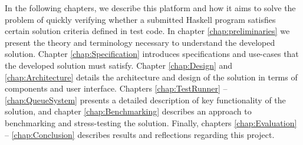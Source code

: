 In the following chapters, we describe this platform and how it aims to solve the problem of quickly verifying whether a submitted Haskell program satisfies certain solution criteria defined in test code. 
In chapter \ref{chap:preliminaries} we present the theory and terminology necessary to understand the developed solution. 
Chapter \ref{chap:Specification} introduces specifications and use-cases that the developed solution must satisfy. 
Chapter \ref{chap:Design} and \ref{chap:Architecture} details the architecture and design of the solution in terms of components and user interface.
Chapters \ref{chap:TestRunner} -- \ref{chap:QueueSystem} presents a detailed description of key functionality of the solution, and chapter \ref{chap:Benchmarking} describes an approach to benchmarking and stress-testing the solution. 
Finally, chapters \ref{chap:Evaluation} -- \ref{chap:Conclusion} describes results and reflections regarding this project.


